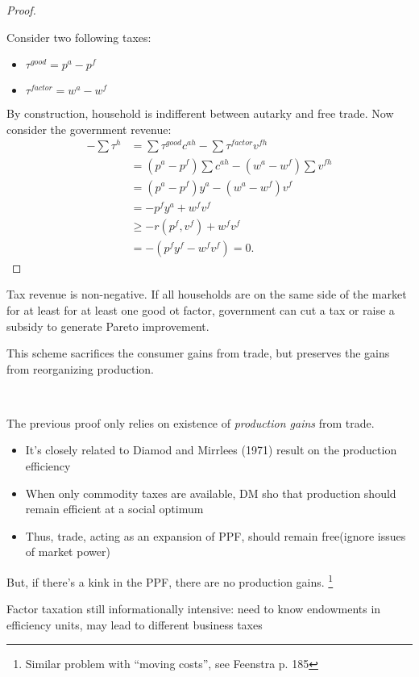 \begin{proof}
    \

    Consider two following taxes:
    \begin{itemize}
        \item $\tau ^{good} = p^a - p^f$
        \item $\tau ^{factor} = w^a - w^f$
    \end{itemize}
    By construction, household is indifferent between autarky and free trade.
    Now consider the government revenue:
    \begin{align*}
        - \sum \tau ^h &= \sum \tau ^{good} c^{ah} - \sum \tau ^{factor} v^{fh} \\ 
        &= (p^a - p^f) \sum c^{ah} - (w^a - w^f) \sum v^{fh} \\
        &= (p^a - p^f) y^a - (w^a - w^f) v^f \\
        &= -p^f y^a + w^f v^f \\
        & \geq -r(p^f, v^f) + w^f v^f \\
        &= -(p^f y^f - w^f v^f) = 0.
    \end{align*}
\end{proof}

Tax revenue is non-negative. If all households are on the same side of the market
for at least for at least one good ot factor, government can cut a tax or raise a subsidy
to generate Pareto improvement.

This scheme sacrifices the consumer gains from trade,
but preserves the gains from reorganizing production.

\begin{note}
    \

    The previous proof only relies on existence of \textit{production gains} from trade.
    \begin{itemize}
        \item It's closely related to Diamod and Mirrlees (1971) result on the production efficiency
        \item When only commodity taxes are available, DM sho that production should remain efficient at a social optimum
        \item Thus, trade, acting as an expansion of PPF, should remain free(ignore issues of market power)
    \end{itemize}
    But, if there's a kink in the PPF, there are no production gains. \footnote{Similar problem with ``moving costs'', see Feenstra p. 185}

    Factor taxation still informationally intensive: need to know
endowments in efficiency units, may lead to different business taxes
\end{note}

